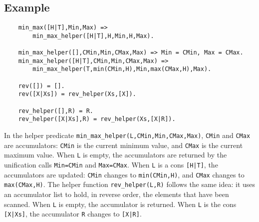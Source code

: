 \subsection*{Example}
\begin{verbatim}
    min_max([H|T],Min,Max) => 
        min_max_helper([H|T],H,Min,H,Max).

    min_max_helper([],CMin,Min,CMax,Max) => Min = CMin, Max = CMax.
    min_max_helper([H|T],CMin,Min,CMax,Max) => 
        min_max_helper(T,min(CMin,H),Min,max(CMax,H),Max).

    rev([]) = [].
    rev([X|Xs]) = rev_helper(Xs,[X]).

    rev_helper([],R) = R.
    rev_helper([X|Xs],R) = rev_helper(Xs,[X|R]).
\end{verbatim}
In the helper predicate \texttt{min\_max\_helper(L,CMin,Min,CMax,Max)}, \texttt{CMin} and \texttt{CMax} are accumulators: \texttt{CMin} is the current minimum value, and \texttt{CMax} is the current maximum value. When \texttt{L} is empty, the accumulators are returned by the unification calls \texttt{Min=CMin} and \texttt{Max=CMax}. When \texttt{L} is a cons \texttt{[H|T]}, the accumulators are updated: \texttt{CMin} changes to \texttt{min(CMin,H)}, and \texttt{CMax} changes to \texttt{max(CMax,H)}. The helper function \texttt{rev\_helper(L,R)} follows the same idea: it uses an accumulator list to hold, in reverse order, the elements that have been scanned. When \texttt{L} is empty, the accumulator is returned. When \texttt{L} is the cons \texttt{[X|Xs]}, the accumulator \texttt{R} changes to \texttt{[X|R]}.
\ignore{

}


